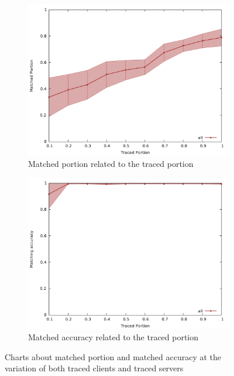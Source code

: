 \begin{figure}[H]
	\begin{subfigure}{.5\textwidth}
		\centering
		\includegraphics[width=1\linewidth]{graphs/cs_tport_mport.pdf}
		\caption{Matched portion related to the traced portion}
		\label{fig:g_tporta}
	\end{subfigure} 
	\begin{subfigure}{.5\textwidth}
		\centering
		\includegraphics[width=1\linewidth]{graphs/cs_tport_pmatch.pdf}
		\caption{Matched accuracy related to the traced portion}
		\label{fig:g_tportb}
	\end{subfigure} 
	\caption{Charts about matched portion and matched accuracy at the variation of both
traced clients and traced servers}
	\label{fig:g_tport}
\end{figure}


